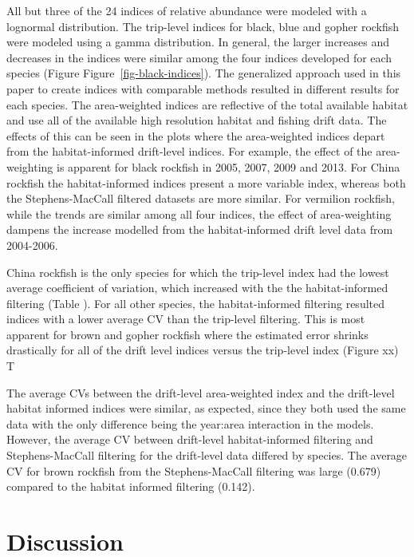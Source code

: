 \documentclass[
  12pt,
  authoryear,
  preprint,
  3p]{elsarticle}
\begin{document}
All but three of the 24 indices of relative abundance were modeled with
a lognormal distribution. The trip-level indices for black, blue and
gopher rockfish were modeled using a gamma distribution. In general, the
larger increases and decreases in the indices were similar among the
four indices developed for each species (Figure
Figure~\ref{fig-black-indices}). The generalized approach used in this
paper to create indices with comparable methods resulted in different
results for each species. The area-weighted indices are reflective of
the total available habitat and use all of the available high resolution
habitat and fishing drift data. The effects of this can be seen in the
plots where the area-weighted indices depart from the habitat-informed
drift-level indices. For example, the effect of the area-weighting is
apparent for black rockfish in 2005, 2007, 2009 and 2013. For China
rockfish the habitat-informed indices present a more variable index,
whereas both the Stephens-MacCall filtered datasets are more similar.
For vermilion rockfish, while the trends are similar among all four
indices, the effect of area-weighting dampens the increase modelled from
the habitat-informed drift level data from 2004-2006.

China rockfish is the only species for which the trip-level index had
the lowest average coefficient of variation, which increased with the
the habitat-informed filtering (Table \citet{tab-CV}). For all other
species, the habitat-informed filtering resulted indices with a lower
average CV than the trip-level filtering. This is most apparent for
brown and gopher rockfish where the estimated error shrinks drastically
for all of the drift level indices versus the trip-level index (Figure
xx) T

The average CVs between the drift-level area-weighted index and the
drift-level habitat informed indices were similar, as expected, since
they both used the same data with the only difference being the
year:area interaction in the models. However, the average CV between
drift-level habitat-informed filtering and Stephens-MacCall filtering
for the drift-level data differed by species. The average CV for brown
rockfish from the Stephens-MacCall filtering was large (0.679) compared
to the habitat informed filtering (0.142).

\FloatBarrier

\hypertarget{discussion}{%
\section{Discussion}\label{discussion}}
\end{document}
